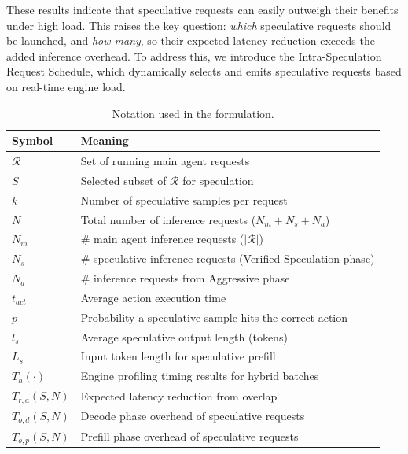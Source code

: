These results indicate that speculative requests can easily outweigh their benefits under high load. 
This raises the key question: \emph{which} speculative requests should be launched, and \emph{how many}, so their expected latency reduction exceeds the added inference overhead.
To address this, we introduce the Intra-Speculation Request Schedule, which dynamically selects and emits speculative requests based on real-time engine load.


\begin{table}[t]
    \centering
    \small
    \caption{Notation used in the formulation.}
    \setlength\tabcolsep{2pt} %
    \footnotesize
    \begin{tabular}{ll}
        \toprule
        \textbf{Symbol} & \textbf{Meaning} \\
        \midrule
        $\mathcal{R}$ & Set of running main agent requests \\
        $S$ & Selected subset of $\mathcal{R}$ for speculation \\
        $k$ & Number of speculative samples per request \\
        $N$ & Total number of inference requests ($N_m{+}N_s{+}N_a$) \\
        $N_m$ & \# main agent inference requests ($|\mathcal{R}|$) \\
        $N_s$ & \# speculative inference requests (Verified Speculation phase) \\
        $N_a$ & \# inference requests from Aggressive phase \\
        $t_{act}$ & Average action execution time \\
        $p$ & Probability a speculative sample hits the correct action \\
        $l_s$ & Average speculative output length (tokens) \\
        $L_s$ & Input token length for speculative prefill \\
        $T_h(\cdot)$ & Engine profiling timing results for hybrid batches \\
        $T_{r,a}(S,N)$ & Expected latency reduction from overlap \\
        $T_{o,d}(S,N)$ & Decode phase overhead of speculative requests \\
        $T_{o,p}(S,N)$ & Prefill phase overhead of speculative requests \\
        \bottomrule
    \end{tabular}
    \label{tab:notion}
\end{table}

